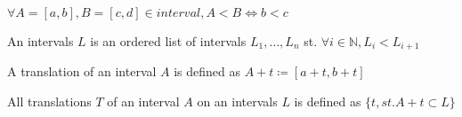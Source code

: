 \documentclass[runningheads]{llncs}
\begin{document}
    \begin{definition}
        $\forall A = [a,b], B = [c,d] \in interval, A < B \Leftrightarrow b < c$
    \end{definition}

    \begin{definition}
        An intervals $L$ is an ordered list of intervals ${L_1,\ldots,L_n}$ st. $\forall i \in \mathbb{N}, L_i < L_{i+1}$
    \end{definition}

    \begin{definition}
        A translation of an interval $A$ is defined as $A+t \coloneqq [a+t, b+t]$
    \end{definition}

    \begin{definition}
        All translations $T$ of an interval $A$ on an intervals $L$ is defined as $\{t, st. A+t \subset L\}$
    \end{definition}
\end{document}
